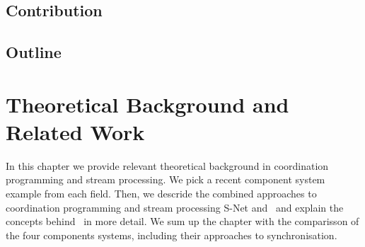 


    \section{Contribution}


    \section{Outline}


\chapter{Theoretical Background and Related Work}
In this chapter we provide relevant theoretical background in coordination programming and stream processing. We pick a recent component system example from each field. Then, we descride the combined approaches to coordination programming and stream processing S-Net and \ak\ and explain the concepts behind \ak\ in more detail. We sum up the chapter with the comparisson of the four components systems, including their approaches to synchronisation.



